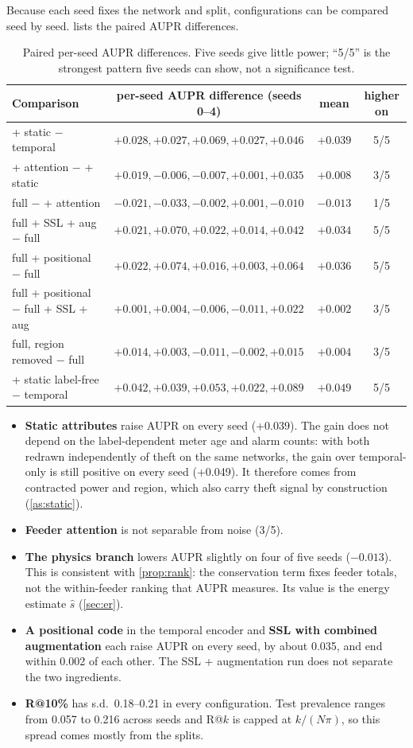 \documentclass[11pt,a4paper]{article}
\theoremstyle{plain}
\theoremstyle{definition}
\theoremstyle{remark}
\begin{document}
Because each seed fixes the network and split, configurations can be compared seed by seed.  lists the paired AUPR differences.
\begin{table}[htbp]
\centering\small
\begin{tabular}{@{}lccc@{}}
\toprule
Comparison & per-seed AUPR difference (seeds 0--4) & mean & higher on\\
\midrule
+ static $-$ temporal & $+0.028, +0.027, +0.069, +0.027, +0.046$ & $+0.039$ & 5/5\\
+ attention $-$ + static & $+0.019, -0.006, -0.007, +0.001, +0.035$ & $+0.008$ & 3/5\\
full $-$ + attention & $-0.021, -0.033, -0.002, +0.001, -0.010$ & $-0.013$ & 1/5\\
full + SSL + aug $-$ full & $+0.021, +0.070, +0.022, +0.014, +0.042$ & $+0.034$ & 5/5\\
full + positional $-$ full & $+0.022, +0.074, +0.016, +0.003, +0.064$ & $+0.036$ & 5/5\\
full + positional $-$ full + SSL + aug & $+0.001, +0.004, -0.006, -0.011, +0.022$ & $+0.002$ & 3/5\\
full, region removed $-$ full & $+0.014, +0.003, -0.011, -0.002, +0.015$ & $+0.004$ & 3/5\\
+ static label-free $-$ temporal & $+0.042, +0.039, +0.053, +0.022, +0.089$ & $+0.049$ & 5/5\\
\bottomrule
\end{tabular}
\caption{Paired per-seed AUPR differences. Five seeds give little power; ``5/5'' is the strongest pattern five seeds can show, not a significance test.}
\label{tab:paired}
\end{table}
\begin{itemize}
\item \textbf{Static attributes} raise AUPR on every seed (+0.039). The gain does not depend on the label-dependent meter age and alarm counts: with both redrawn independently of theft on the same networks, the gain over temporal-only is still positive on every seed (+0.049). It therefore comes from contracted power and region, which also carry theft signal by construction (\cref{as:static}).
\item \textbf{Feeder attention} is not separable from noise (3/5).
\item \textbf{The physics branch} lowers AUPR slightly on four of five seeds ($-0.013$). This is consistent with \cref{prop:rank}: the conservation term fixes feeder totals, not the within-feeder ranking that AUPR measures. Its value is the energy estimate $\hat s$ (\cref{sec:er}).
\item \textbf{A positional code} in the temporal encoder and \textbf{SSL with combined augmentation} each raise AUPR on every seed, by about 0.035, and end within 0.002 of each other. The SSL + augmentation run does not separate the two ingredients.
\item \textbf{R@10\%} has s.d.\ 0.18--0.21 in every configuration. Test prevalence ranges from 0.057 to 0.216 across seeds and R@$k$ is capped at $k/(N\pi)$, so this spread comes mostly from the splits.
\end{itemize}
\end{document}
